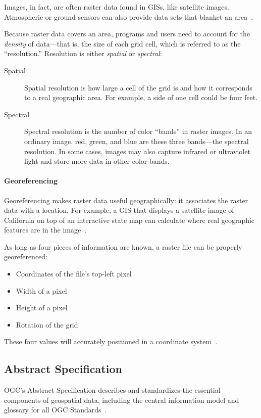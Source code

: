 Images, in fact, are often raster data found in GISs, like satellite images. Atmospheric or ground sensors can also provide data sets that blanket an area~\cite{gentle_intro}.

Because raster data covers an area, programs and users need to account for the \textit{density} of data---that is, the size of each grid cell, which is referred to as the ``resolution.'' Resolution is either \textit{spatial} or \textit{spectral}:

\begin{description}
  \item[Spatial] Spatial resolution is how large a cell of the grid is and how it corresponds to a real geographic area. For example, a side of one cell could be four feet.
  \item[Spectral] Spectral resolution is the number of color ``bands'' in raster images. In an ordinary image, red, green, and blue are these three bands---the spectral resolution. In some cases, images may also capture infrared or ultraviolet light and store more data in other color bands.
\end{description}

\paragraph{Georeferencing}
Georeferencing makes raster data useful geographically: it associates the raster data with a location. For example, a GIS that displays a satellite image of California on top of an interactive state map can calculate where real geographic features are in the image~\cite{gentle_intro}.

As long as four pieces of information are known, a raster file can be properly georeferenced:

\begin{itemize}
  \item Coordinates of the file's top-left pixel
  \item Width of a pixel
  \item Height of a pixel
  \item Rotation of the grid
\end{itemize}

These four values will accurately positioned in a coordinate system~\cite{gentle_intro}.

\subsection{Abstract Specification}
OGC's Abstract Specification describes and standardizes the essential components of geospatial data, including the central information model and glossary for all OGC Standards~\cite{AbstractSpecFaq}.

